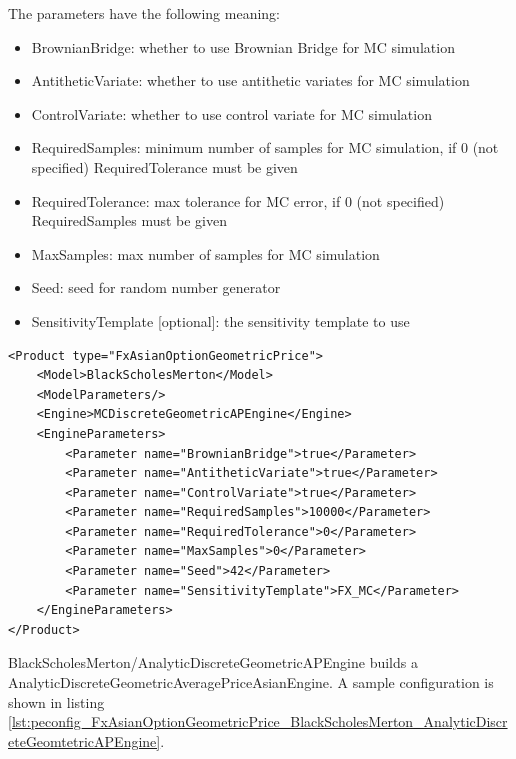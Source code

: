 The parameters have the following meaning:

\begin{itemize}
\item BrownianBridge: whether to use Brownian Bridge for MC simulation
\item AntitheticVariate: whether to use antithetic variates for MC simulation
\item ControlVariate: whether to use control variate for MC simulation
\item RequiredSamples: minimum number of samples for MC simulation, if 0 (not specified) RequiredTolerance must be given
\item RequiredTolerance: max tolerance for MC error, if 0 (not specified) RequiredSamples must be given
\item MaxSamples: max number of samples for MC simulation
\item Seed: seed for random number generator
\item SensitivityTemplate [optional]: the sensitivity template to use
\end{itemize}

\begin{longlisting}
\begin{verbatim}
<Product type="FxAsianOptionGeometricPrice">
    <Model>BlackScholesMerton</Model>
    <ModelParameters/>
    <Engine>MCDiscreteGeometricAPEngine</Engine>
    <EngineParameters>
        <Parameter name="BrownianBridge">true</Parameter>
        <Parameter name="AntitheticVariate">true</Parameter>
        <Parameter name="ControlVariate">true</Parameter>
        <Parameter name="RequiredSamples">10000</Parameter>
        <Parameter name="RequiredTolerance">0</Parameter>
        <Parameter name="MaxSamples">0</Parameter>
        <Parameter name="Seed">42</Parameter>
        <Parameter name="SensitivityTemplate">FX_MC</Parameter>
    </EngineParameters>
</Product>
\end{verbatim}
\caption{Configuration for Product FxAsianOptionGeometricPrice, Model BlackScholesMerton, Engine MCDiscreteGeometricAPEngine}
\label{lst:peconfig_FxAsianOptionGeometricPrice_BlackScholesMerton_MCDiscreteGeomtetricAPEngine}
\end{longlisting}

BlackScholesMerton/AnalyticDiscreteGeometricAPEngine builds a AnalyticDiscreteGeometricAveragePriceAsianEngine. A sample
configuration is shown in listing
\ref{lst:peconfig_FxAsianOptionGeometricPrice_BlackScholesMerton_AnalyticDiscreteGeomtetricAPEngine}.

